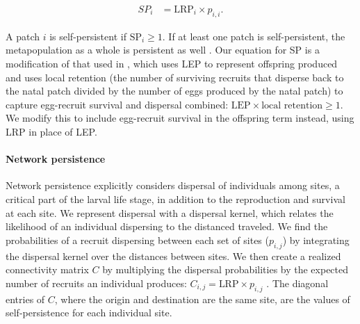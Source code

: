 \documentclass[12pt, oneside]{article}   	%
\begin{document}
\begin{equation}
\begin{split}
SP_i &= \text{LRP}_i \times p_{i,i}. \label{EQN_SP}  %
\end{split}
\end{equation}


A patch $i$ is self-persistent if $\text{SP}_i \geq 1$. If at least one patch is self-persistent, the metapopulation as a whole is persistent as well \citep{hastings_persistence_2006, burgess2014beyond}. Our equation for SP is a modification of that used in \cite{burgess2014beyond}, which uses LEP to represent offspring produced and uses local retention (the number of surviving recruits that disperse back to the natal patch divided by the number of eggs produced by the natal patch) to capture egg-recruit survival and dispersal combined: $\text{LEP} \times \text{local retention} \geq 1$. We modify this to include egg-recruit survival in the offspring term instead, using LRP in place of LEP. %

\paragraph*{Network persistence}

Network persistence explicitly considers dispersal of individuals among sites, a critical part of the larval life stage, in addition to the reproduction and survival at each site. We represent dispersal with a dispersal kernel, which relates the likelihood of an individual dispersing to the distanced traveled. We find the probabilities of a recruit dispersing between each set of sites ($p_{i,j}$) by integrating the dispersal kernel over the distances between sites. We then create a realized connectivity matrix $C$ by multiplying the dispersal probabilities by the expected number of recruits an individual produces: $C_{i,j} = \text{LRP} \times p_{i,j}$ \citep[][though we include egg-recruit survival in LRP, rather than in $p_{i,j}$ as they do]{burgess2014beyond}. The diagonal entries of $C$, where the origin and destination are the same site, are the values of self-persistence for each individual site. 
\end{document}
